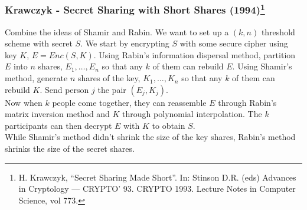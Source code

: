\documentclass[11pt]{article}
\begin{document}
\subsubsection*{Krawczyk - Secret Sharing with Short Shares (1994)\footnote{H. Krawczyk, ``Secret Sharing Made Short''. In: Stinson D.R. (eds) Advances in Cryptology — CRYPTO’ 93. CRYPTO 1993. Lecture Notes in Computer Science, vol 773.}}
Combine the ideas of Shamir and Rabin. We want to set up a $(k,n)$ threshold scheme with secret $S$. We start by encrypting $S$ with some secure cipher using key $K$, $E = Enc(S, K)$. Using Rabin's information dispersal method, partition $E$ into $n$ shares, $E_1, \ldots, E_n$ so that any $k$ of them can rebuild $E$. Using Shamir's method, generate $n$ shares of the key, $K_1, \ldots, K_n$ so that any $k$ of them can rebuild $K$. Send person $j$ the pair $(E_j, K_j)$.\\

\noindent Now when $k$ people come together, they can reassemble $E$ through Rabin's matrix inversion method and $K$ through polynomial interpolation. The $k$ participants can then decrypt $E$ with $K$ to obtain $S$.\\

\noindent While Shamir's method didn't shrink the size of the key shares, Rabin's method shrinks the size of the secret shares.



\end{document}
